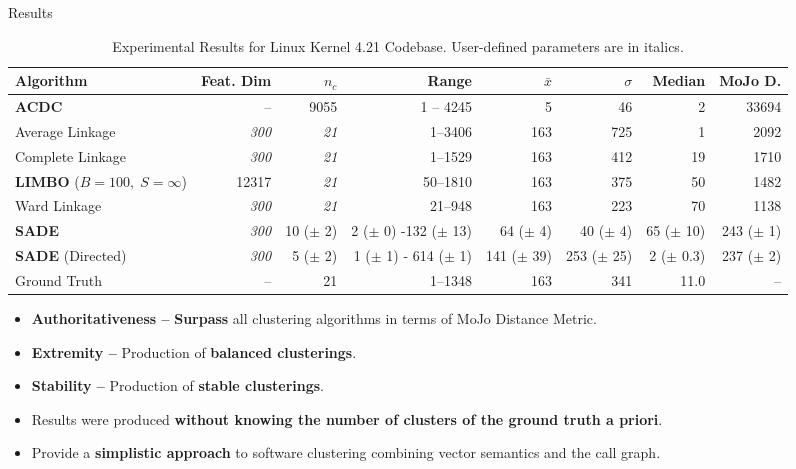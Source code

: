 \documentclass[final]{beamer}
\newlength{\colwidth}
\begin{document}
\begin{frame}[t]
\begin{columns}[t]
\begin{column}{\colwidth}

	

  \begin{block}{Results}

    

    \begin{table}
      \centering
      \small
\begin{tabular}{lrrrrrrr}
    \toprule
    \textbf{Algorithm} & \textbf{Feat. Dim}  & $n_c$ & \textbf{Range} & $\bar x$ & $\sigma$ & \textbf{Median} & \textbf{MoJo D.} \\
    \midrule
    \textbf{ACDC}  & -- & 9055 & 1 -- 4245 & 5 & 46 & 2 & 33694\\
    Average Linkage  & \emph{300} & \emph{21} & 1--3406 & 163 & 725 & 1 & 2092 \\
    Complete Linkage  & \emph{300} & \emph{21} & 1--1529 & 163 & 412 & 19 & 1710 \\
    \textbf{LIMBO}  ($B=100, \; S = \infty$) & 12317 &\emph{21} & 50--1810 & 163 & 375 & 50  & 1482 \\

    Ward Linkage & \emph{300} & \emph{21} & 21--948 & 163 & 223 & 70 & 1138 \\
        
    \textbf{SADE} & \emph{300} & 10 ($\pm$ 2)  & 2 ($\pm$ 0) -132 ($\pm$ 13) & 64 ($\pm$ 4) & 40 ($\pm$ 4) & 65 ($\pm$ 10) & 243 ($\pm$ 1)  \\
    \textbf{SADE} (Directed) & \emph{300} & 5 ($\pm$ 2) & 1 ($\pm$ 1) - 614 ($\pm$ 1) & 141 ($\pm$ 39) & 253 ($\pm$ 25) & 2 ($\pm$ 0.3)  & 237 ($\pm$ 2) \\
    \midrule
    Ground Truth & -- & 21 & 1--1348 & 163 & 341 & 11.0 & -- \\
    \bottomrule
  \end{tabular}

      \caption{Experimental Results for Linux Kernel 4.21 Codebase. User-defined parameters are in italics.}
    \end{table}


	\begin{itemize}
		\justifying
    \item \textbf{Authoritativeness -- } \textbf{Surpass} all clustering algorithms in terms of MoJo Distance Metric.
    \item \textbf{Extremity -- } Production of \textbf{balanced clusterings}.
    \item \textbf{Stability -- } Production of \textbf{stable clusterings}.
    \item Results were produced \textbf{without knowing the number of clusters of the ground truth a priori}.
    \item Provide a \textbf{simplistic approach} to software clustering combining vector semantics and the call graph.
	\end{itemize}
	



\end{block}
\end{column}
\end{columns}
\end{frame}
\end{document}
